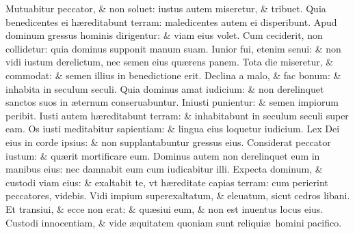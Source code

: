 \documentclass[a5paper,10pt]{book}
\def\ae{æ}
\begin{document}
\begin{multicols*}{2}
\newline \color{red} M\color{black}utuabitur peccator, \& non soluet: iustus autem miseretur, \& tribuet.
\newline \color{red} Q\color{black}uia benedicentes ei h\ae reditabunt terram: maledicentes autem ei disperibunt.
\newline \color{red} A\color{black}pud dominum gressus hominis dirigentur: \& viam eius volet.
\newline \color{red} C\color{black}um ceciderit, non collidetur: quia dominus supponit manum suam.
\newline \color{red} I\color{black}unior fui, etenim senui: \& non vidi iustum derelictum, nec semen eius qu\ae rens panem.
\newline \color{red} T\color{black}ota die miseretur, \& commodat: \& semen illius in benedictione erit.
\newline \color{red} D\color{black}eclina a malo, \& fac bonum: \& inhabita in seculum seculi.
\newline \color{red} Q\color{black}uia dominus amat iudicium: \& non derelinquet sanctos suos in \ae ternum conseruabuntur.
\newline \color{red} I\color{black}niusti punientur: \& semen impiorum peribit.
\newline \color{red} I\color{black}usti autem h\ae reditabunt terram: \& inhabitabunt in seculum seculi super eam.
\newline \color{red} O\color{black}s iusti meditabitur sapientiam: \& lingua eius loquetur iudicium.
\newline \color{red} L\color{black}ex Dei eius in corde ipsius: \& non supplantabuntur gressus eius.
\newline \color{red} C\color{black}onsiderat peccator iustum: \& qu\ae rit mortificare eum.
\newline \color{red} D\color{black}ominus autem non derelinquet eum in manibus eius: nec damnabit eum cum iudicabitur illi.
\newline \color{red} E\color{black}xpecta dominum, \& custodi viam eius: \& exaltabit te, vt h\ae reditate capias terram: cum perierint peccatores, videbis.
\newline \color{red} V\color{black}idi impium superexaltatum, \& eleuatum, sicut cedros libani.
\newline \color{red} E\color{black}t transiui, \& ecce non erat: \& qu\ae siui eum, \& non est inuentus locus eius.
\newline \color{red} C\color{black}ustodi innocentiam, \& vide \ae quitatem quoniam sunt reliqui\ae \ homini pacifico.

\end{multicols*}
\end{document}
